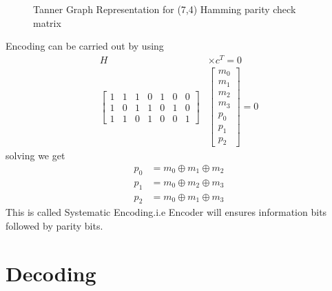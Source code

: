 \documentclass[journal,12pt,twocolumn]{IEEEtran}
\begin{document}
\begin{figure}[!ht]
\begin{center}
\caption{Tanner Graph Representation for (7,4) Hamming parity check matrix}
\label{fig:tanner}
\end{center}
\end{figure}
Encoding can be carried out by using 
\begin{align}
H &\times c^T =0 \\
 \begin{bmatrix} 
1 & 1 & 1 & 0 & 1 & 0 & 0 \\
1 & 0 & 1 & 1 & 0 & 1 & 0 \\
1 & 1 & 0 & 1 & 0 & 0 & 1 
\end{bmatrix} &  \begin{bmatrix} 
m_0\\
m_1\\
m_2\\
m_3 \\
p_0 \\
p_1\\
p_2
\end{bmatrix} = 0
\end{align}
solving we get
\begin{align}
p_0 &= m_0 \oplus m_1 \oplus m_2 \\
p_1 &= m_0 \oplus m_2 \oplus m_3 \\
p_2 &= m_0 \oplus m_1 \oplus m_3 
\end{align}
This is called Systematic Encoding.i.e Encoder will ensures information bits followed by parity bits.
\section{Decoding}
\end{document}
